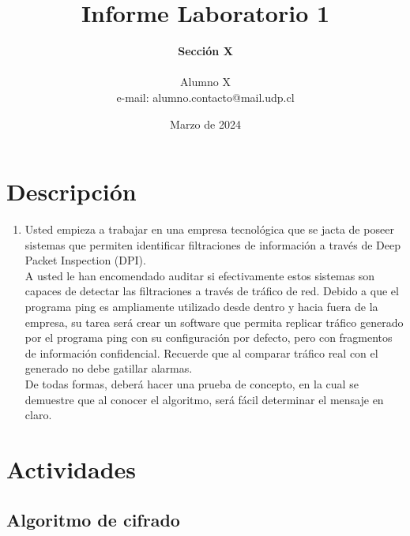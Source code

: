 \documentclass[letter,12pt]{article}
\begin{document}
%
   \title{\Huge{Informe Laboratorio 1}}

   \author{\textbf{Sección X} \\  \\Alumno X \\ e-mail: alumno.contacto@mail.udp.cl}
          
   \date{Marzo de 2024}

   \maketitle
   
   \tableofcontents
 
  \newpage
  

\section{Descripción}

\begin{enumerate}
    \item Usted empieza a trabajar en una empresa tecnológica que se jacta de poseer sistemas que permiten identificar filtraciones de información a través de Deep Packet Inspection (DPI).\\
    A usted le han encomendado auditar si efectivamente estos sistemas son capaces de detectar las filtraciones a través de tráfico de red. Debido a que el programa ping es ampliamente utilizado desde dentro y hacia fuera de la empresa, su tarea será crear un software que permita replicar tráfico generado por el programa ping con su configuración por defecto, pero con fragmentos de información confidencial. Recuerde que al comparar tráfico real con el generado no debe gatillar alarmas. \\
    De todas formas, deberá hacer una prueba de concepto, en la cual se demuestre que al conocer el algoritmo, será fácil determinar el mensaje en claro.
    


\end{enumerate}


\section{Actividades}


\subsection{Algoritmo de cifrado}
\end{document}
